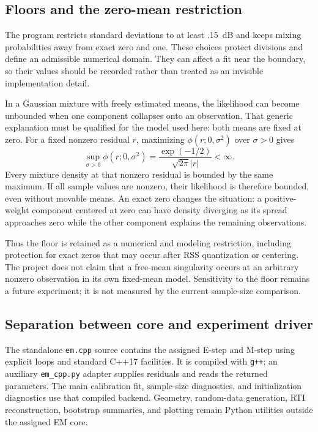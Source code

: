 \documentclass[conference,letterpaper]{IEEEtran}
\begin{document}
\subsection{Floors and the zero-mean restriction}
The program restricts standard deviations to at least .15~dB and keeps mixing probabilities away from exact zero and one. These choices protect divisions and define an admissible numerical domain. They can affect a fit near the boundary, so their values should be recorded rather than treated as an invisible implementation detail.

In a Gaussian mixture with freely estimated means, the likelihood can become unbounded when one component collapses onto an observation. That generic explanation must be qualified for the model used here: both means are fixed at zero. For a fixed nonzero residual $r$, maximizing $\phi(r;0,\sigma^2)$ over $\sigma>0$ gives
\begin{equation}
\sup_{\sigma>0}\phi(r;0,\sigma^2)
=\frac{\exp(-1/2)}{\sqrt{2\pi}|r|}<\infty.
\end{equation}
Every mixture density at that nonzero residual is bounded by the same maximum. If all sample values are nonzero, their likelihood is therefore bounded, even without movable means. An exact zero changes the situation: a positive-weight component centered at zero can have density diverging as its spread approaches zero while the other component explains the remaining observations.

Thus the floor is retained as a numerical and modeling restriction, including protection for exact zeros that may occur after RSS quantization or centering. The project does not claim that a free-mean singularity occurs at an arbitrary nonzero observation in its own fixed-mean model. Sensitivity to the floor remains a future experiment; it is not measured by the current sample-size comparison.

\subsection{Separation between core and experiment driver}
The standalone \texttt{em.cpp} source contains the assigned E-step and M-step using explicit loops and standard C++17 facilities. It is compiled with \texttt{g++}; an auxiliary \texttt{em\_cpp.py} adapter supplies residuals and reads the returned parameters. The main calibration fit, sample-size diagnostics, and initialization diagnostics use that compiled backend. Geometry, random-data generation, RTI reconstruction, bootstrap summaries, and plotting remain Python utilities outside the assigned EM core.
\end{document}
